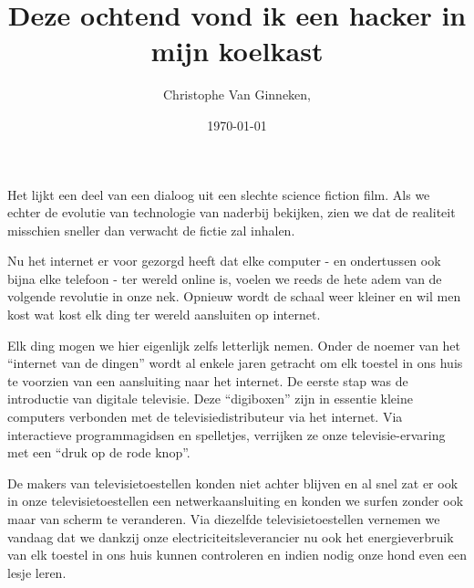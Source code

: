 \documentclass[DIV=calc,paper=a4,fontsize=11pt,twocolumn,draft]{scrartcl}
\title{Deze ochtend vond ik een hacker in mijn koelkast}
\author{Christophe Van Ginneken, }
\date{\today}
\newcommand{\initial}[1]{
\lettrine[lines=4,lhang=0.3,nindent=0em]{
\color{DarkGoldenrod}
{\textsf{#1}}}{}}
\begin{document}
\thispagestyle{fancy}


\initial{H}et lijkt een deel van een dialoog uit een slechte science fiction
film. Als we echter de evolutie van technologie van naderbij bekijken, zien we
dat de realiteit misschien sneller dan verwacht de fictie zal inhalen.

Nu het internet er voor gezorgd heeft dat elke computer - en ondertussen ook
bijna elke telefoon - ter wereld online is, voelen we reeds de hete adem van de
volgende revolutie in onze nek. Opnieuw wordt de schaal weer kleiner en wil men
kost wat kost elk ding ter wereld aansluiten op internet.

Elk ding mogen we hier eigenlijk zelfs letterlijk nemen. Onder de noemer van
het ``internet van de dingen'' wordt al enkele jaren getracht om elk toestel in
ons huis te voorzien van een aansluiting naar het internet. De eerste stap was
de introductie van digitale televisie. Deze ``digiboxen'' zijn in essentie
kleine computers verbonden met de televisiedistributeur via het internet. Via
interactieve programmagidsen en spelletjes, verrijken ze onze
televisie-ervaring met een ``druk op de rode knop''.

De makers van televisietoestellen konden niet achter blijven en al snel zat er
ook in onze televisietoestellen een netwerkaansluiting en konden we surfen
zonder ook maar van scherm te veranderen. Via diezelfde televisietoestellen
vernemen we vandaag dat we dankzij onze electriciteitsleverancier nu ook het
energieverbruik van elk toestel in ons huis kunnen controleren en indien nodig
onze hond even een lesje leren.
\end{document}
